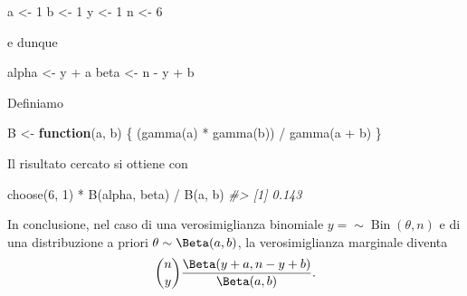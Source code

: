 \documentclass[
  10pt,
  italian,
  a4paper,
  extrafontsizes,onecolumn,openright
  ]{memoir}
\newenvironment{Shaded}{\begin{snugshade}}{\end{snugshade}}
\newcommand{\CommentTok}[1]{\textcolor[rgb]{0.56,0.35,0.01}{\textit{#1}}}
\newcommand{\ControlFlowTok}[1]{\textcolor[rgb]{0.13,0.29,0.53}{\textbf{#1}}}
\newcommand{\DecValTok}[1]{\textcolor[rgb]{0.00,0.00,0.81}{#1}}
\newcommand{\FunctionTok}[1]{\textcolor[rgb]{0.00,0.00,0.00}{#1}}
\newcommand{\NormalTok}[1]{#1}
\newcommand{\OtherTok}[1]{\textcolor[rgb]{0.56,0.35,0.01}{#1}}
\newcommand{\SpecialCharTok}[1]{\textcolor[rgb]{0.00,0.00,0.00}{#1}}
\DeclareMathOperator{\Bin}{Bin} %
\begin{document}
\begin{Shaded}
\begin{Highlighting}[]
\NormalTok{a }\OtherTok{\textless{}{-}} \DecValTok{1}
\NormalTok{b }\OtherTok{\textless{}{-}} \DecValTok{1}
\NormalTok{y }\OtherTok{\textless{}{-}} \DecValTok{1}
\NormalTok{n }\OtherTok{\textless{}{-}} \DecValTok{6}
\end{Highlighting}
\end{Shaded}

\noindent
e dunque

\begin{Shaded}
\begin{Highlighting}[]
\NormalTok{alpha }\OtherTok{\textless{}{-}}\NormalTok{ y }\SpecialCharTok{+}\NormalTok{ a}
\NormalTok{beta }\OtherTok{\textless{}{-}}\NormalTok{ n }\SpecialCharTok{{-}}\NormalTok{ y }\SpecialCharTok{+}\NormalTok{ b}
\end{Highlighting}
\end{Shaded}

\noindent
Definiamo

\begin{Shaded}
\begin{Highlighting}[]
\NormalTok{B }\OtherTok{\textless{}{-}} \ControlFlowTok{function}\NormalTok{(a, b) \{}
\NormalTok{  (}\FunctionTok{gamma}\NormalTok{(a) }\SpecialCharTok{*} \FunctionTok{gamma}\NormalTok{(b)) }\SpecialCharTok{/} \FunctionTok{gamma}\NormalTok{(a }\SpecialCharTok{+}\NormalTok{ b)}
\NormalTok{\}}
\end{Highlighting}
\end{Shaded}

\noindent
Il risultato cercato si ottiene con

\begin{Shaded}
\begin{Highlighting}[]
\FunctionTok{choose}\NormalTok{(}\DecValTok{6}\NormalTok{, }\DecValTok{1}\NormalTok{) }\SpecialCharTok{*} \FunctionTok{B}\NormalTok{(alpha, beta) }\SpecialCharTok{/} \FunctionTok{B}\NormalTok{(a, b)}
\CommentTok{\#\textgreater{} [1] 0.143}
\end{Highlighting}
\end{Shaded}

In conclusione, nel caso di una verosimiglianza binomiale \(y = \sim \Bin(\theta, n)\) e di una distribuzione a priori \(\theta \sim \Beta(a, b)\), la verosimiglianza marginale diventa
\begin{equation}
\binom{n}{y}\frac{\Beta(y + a, n - y + b)}{\Beta(a, b)}.
\label{eq:constant-norm-beta-binom}
\end{equation}
\end{document}
